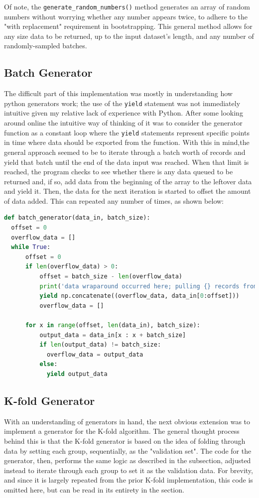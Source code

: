 \documentclass{article}
\begin{document}
Of note, the \lstinline{generate_random_numbers()} method generates an array of random numbers without worrying whether any number appears twice, to adhere to the "with replacement" requirement in bootstrapping.
This general method allows for any size data to be returned, up to the input dataset's length, and any number of randomly-sampled batches.

\subsection{Batch Generator}
The difficult part of this implementation was mostly in understanding how python generators work; the use of the \lstinline{yield} statement was not immediately intuitive given my relative lack of experience with Python.
After some looking around online the intuitive way of thinking of it was to consider the generator function as a constant loop where the \lstinline{yield} statements represent specific points in time where data should be exported from the function.
With this in mind,the general approach seemed to be to iterate through a batch worth of records and yield that batch until the end of the data input was reached.
When that limit is reached, the program checks to see whether there is any data queued to be returned and, if so, add data from the beginning of the array to the leftover data and yield it.
Then, the data for the next iteration is started to offset the amount of data added. 
This can repeated any number of times, as shown below:
\begin{lstlisting}[language=Python]
def batch_generator(data_in, batch_size):
  offset = 0
  overflow_data = [] 
  while True:
      offset = 0
      if len(overflow_data) > 0:
          offset = batch_size - len(overflow_data)
          print('data wraparound occurred here; pulling {} records from front'.format(offset))
          yield np.concatenate((overflow_data, data_in[0:offset]))
          overflow_data = []

      for x in range(offset, len(data_in), batch_size):
          output_data = data_in[x : x + batch_size]
          if len(output_data) != batch_size:
            overflow_data = output_data
          else:
            yield output_data
\end{lstlisting}

\subsection{K-fold Generator}
With an understanding of generators in hand, the next obvious extension was to implement a generator for the K-fold algorithm.
The general thought process behind this is that the K-fold generator is based on the idea of folding through data by setting each group, sequentially, as the "validation set".
The code for the generator, then, performs the same logic as described in the  subsection, adjusted instead to iterate through each group to set it as the validation data.
For brevity, and since it is largely repeated from the prior K-fold implementation, this code is omitted here, but can be read in its entirety in the  section.
\end{document}
